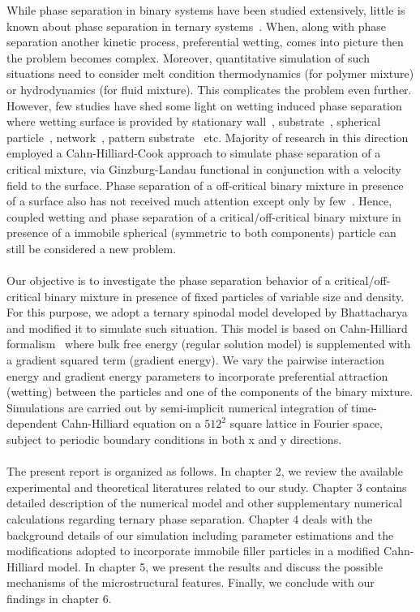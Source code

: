 \documentclass[12pt]{iiscthes}
\theoremstyle{definition}
\theoremstyle{definition}
\theoremstyle{remark}
\begin{document}
While phase separation in binary systems have been studied extensively, little is known about phase separation in ternary systems~\cite{Chen,Eyre,RNauman}. When, along with phase separation another kinetic process, preferential wetting, comes into picture then the problem becomes complex. Moreover, quantitative simulation of such situations need to consider melt condition thermodynamics (for polymer mixture) or hydrodynamics (for fluid mixture). This complicates the problem even further. However, few studies have shed some light on wetting induced phase separation where wetting surface is provided by stationary wall~\cite{Puri,Brown}, substrate~\cite{Puri}, spherical particle~\cite{Lee}, network~\cite{Chakrabarti}, pattern substrate~\cite{Puri} etc. Majority of research in this direction employed a Cahn-Hilliard-Cook approach to simulate phase separation of a critical mixture, via Ginzburg-Landau functional in conjunction with a velocity field to the surface. Phase separation of a off-critical binary mixture in presence of a surface also has not received much attention except only by few~\cite{Puri,Puri_Frisch,PBinder,Brown}. Hence, coupled wetting and phase separation of a critical/off-critical binary mixture in presence of a immobile spherical (symmetric to both components) particle can still be considered a new problem.
\\ \\
Our objective is to investigate the phase separation behavior of a critical/off-critical binary mixture in presence of fixed particles of variable size and density. For this purpose, we adopt a ternary spinodal model developed by Bhattacharya~\cite{Bhattacharya} and modified it to simulate such situation. This model is based on Cahn-Hilliard formalism~\cite{Cahn} where bulk free energy (regular solution model) is supplemented with a gradient squared term (gradient energy). We vary the pairwise interaction energy and gradient energy parameters to incorporate preferential attraction (wetting) between the particles and one of the components of the binary mixture. Simulations are carried out by semi-implicit numerical integration of time-dependent Cahn-Hilliard equation on a $512^2$ square lattice in Fourier space, subject to periodic boundary conditions in both x and y directions.
\\ \\
The present report is organized as follows. In chapter 2, we review the available experimental and theoretical literatures related to our study.
Chapter 3 contains detailed description of the numerical model and other supplementary numerical calculations regarding ternary phase separation. Chapter 4 deals with the background details of our simulation including parameter estimations and the modifications adopted to incorporate immobile filler particles in a modified Cahn-Hilliard model. In chapter 5, we present the results and discuss the possible mechanisms of the microstructural features. Finally, we conclude with our findings in chapter 6. 
\end{document}
